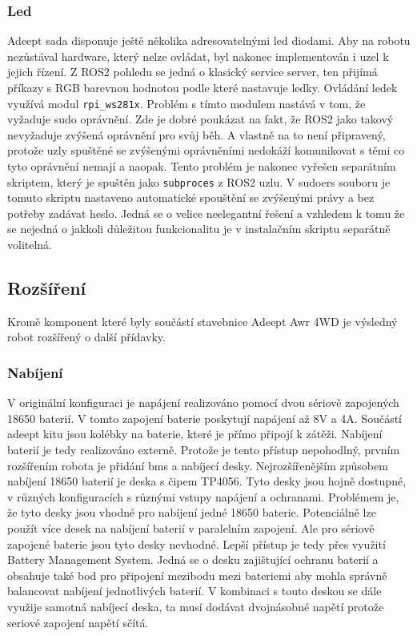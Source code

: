 \subsubsection*{Led}
Adeept sada disponuje ještě několika adresovatelnými led diodami. Aby na robotu nezůstával hardware, který nelze ovládat, byl nakonec implementován i uzel k jejich řízení. Z ROS2 pohledu se jedná o klasický service server, ten přijímá příkazy s RGB barevnou hodnotou podle které nastavuje ledky. Ovládání ledek využívá modul \verb|rpi_ws281x|. Problém s tímto modulem nastává v tom, že vyžaduje sudo oprávnění. Zde je dobré poukázat na fakt, že ROS2 jako takový nevyžaduje zvýšená oprávnění pro svůj běh. A vlastně na to není připravený, protože uzly spuštěné se zvýšenými oprávněními nedokáží komunikovat s těmi co tyto oprávnění nemají a naopak. Tento problém je nakonec vyřešen separátním skriptem, který je spuštěn jako \verb|subproces| z ROS2 uzlu. V sudoers souboru je tomuto skriptu nastaveno automatické spouštění se zvýšenými právy a bez potřeby zadávat heslo. Jedná se o velice neelegantní řešení a vzhledem k tomu že se nejedná o jakkoli důležitou funkcionalitu je v instalačním skriptu separátně volitelná.

\subsection*{Rozšíření}
Kromě komponent které byly součástí stavebnice Adeept Awr 4WD je výsledný robot rozšířený o další přídavky.

\subsubsection*{Nabíjení}
V originální konfiguraci je napájení realizováno pomocí dvou sériově zapojených 18650 baterií. V tomto zapojení baterie poskytují napájení až 8V a 4A. Součástí adeept kitu jsou kolébky na baterie, které je přímo připojí k zátěži. Nabíjení baterií je tedy realizováno externě. Protože je tento přístup nepohodlný, prvním rozšířením robota je přidání bms a nabíjecí desky. 
Nejrozšířenějším způsobem nabíjení 18650 baterií je deska s čipem TP4056. Tyto desky jsou hojně dostupné, v různých konfiguracích s různými vstupy napájení a ochranami. Problémem je, že tyto desky jsou vhodné pro nabíjení jedné 18650 baterie. Potenciálně lze použít více desek na nabíjení baterií v paralelním zapojení. Ale pro sériově zapojené baterie jsou tyto desky nevhodné.
Lepší přístup je tedy přes využití Battery Management System. Jedná se o desku zajištující ochranu baterií a obsahuje také bod pro připojení mezibodu mezi bateriemi aby mohla správně balancovat nabíjení jednotlivých baterií. V kombinaci s touto deskou se dále využije samotná nabíjecí deska, ta musí dodávat dvojnásobné napětí protože seriové zapojení napětí sčítá.

